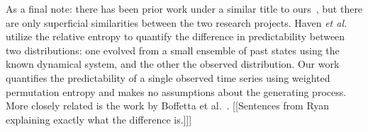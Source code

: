 As a final note: there has been prior work under a similar title to
ours~\cite{haven2005}, but there are only superficial similarities
between the two research projects.  Haven \emph{et al.} utilize the
relative entropy to quantify the difference in predictability between
two distributions: one evolved from a small ensemble of past states
using the known dynamical system, and the other the observed
distribution. Our work quantifies the predictability of a single
observed time series using weighted permutation entropy and makes no
assumptions about the generating process.  More closely related is the
work by Boffetta et al.~\cite{boffetta02}.  \alert{[[Sentences from
      Ryan explaining exactly what the difference is.]]]}






